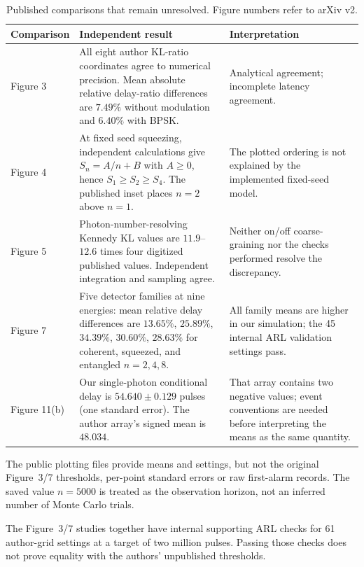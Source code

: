 \documentclass[11pt,a4paper]{article}
\begin{document}
\begin{table}[htbp]
\centering\small
\caption{Published comparisons that remain unresolved. Figure numbers refer
to arXiv v2.}\label{tab:gaps}
\begin{tabularx}{\linewidth}{@{}p{20mm}YY@{}}
\toprule
Comparison & Independent result & Interpretation\\
\midrule
Figure 3 &
All eight author KL-ratio coordinates agree to numerical precision.
Mean absolute relative delay-ratio differences are $7.49\%$ without modulation
and $6.40\%$ with BPSK. &
Analytical agreement; incomplete latency agreement.\\
\addlinespace
Figure 4 &
At fixed seed squeezing, independent calculations give
$S_n=A/n+B$ with $A\geq0$, hence $S_1\geq S_2\geq S_4$.
The published inset places $n=2$ above $n=1$. &
The plotted ordering is not explained by the implemented fixed-seed model.\\
\addlinespace
Figure 5 &
Photon-number-resolving Kennedy KL values are $11.9$--$12.6$ times
four digitized published values. Independent integration and sampling agree. &
Neither on/off coarse-graining nor the checks performed resolve the discrepancy.\\
\addlinespace
Figure 7 &
Five detector families at nine energies: mean relative delay differences
are $13.65\%$, $25.89\%$, $34.39\%$, $30.60\%$, $28.63\%$
for coherent, squeezed, and entangled $n=2,4,8$. &
All family means are higher in our simulation; the 45 internal
ARL validation settings pass.\\
\addlinespace
Figure 11(b) &
Our single-photon conditional delay is $54.640\pm0.129$ pulses
(one standard error). The author array's signed mean is $48.034$. &
That array contains two negative values; event conventions are needed
before interpreting the means as the same quantity.\\
\bottomrule
\end{tabularx}
\end{table}

The public plotting files provide means and settings, but not the original Figure~3/7 thresholds, per-point standard errors or raw first-alarm records. The saved value $n=5000$ is treated as the observation horizon, not an inferred number of Monte Carlo trials.

The Figure~3/7 studies together have internal supporting ARL checks for
61 author-grid settings at a target of two million pulses. Passing those checks
does not prove equality with the authors' unpublished thresholds.
\end{document}
